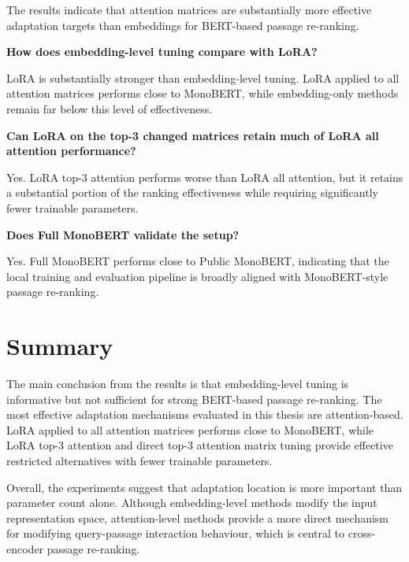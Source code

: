 \begin{description}
The results indicate that attention matrices are substantially more effective adaptation targets than embeddings for BERT-based passage re-ranking.

\vspace{0.6\baselineskip}

\item[\textbf{RQ4}] \textbf{How does embedding-level tuning compare with LoRA?}

\vspace{-0.4\baselineskip}

LoRA is substantially stronger than embedding-level tuning. LoRA applied to all attention matrices performs close to MonoBERT, while embedding-only methods remain far below this level of effectiveness.

\vspace{0.6\baselineskip}

\item[\textbf{RQ5}] \textbf{Can LoRA on the top-3 changed matrices retain much of LoRA all attention performance?}

\vspace{-0.4\baselineskip}

Yes. LoRA top-3 attention performs worse than LoRA all attention, but it retains a substantial portion of the ranking effectiveness while requiring significantly fewer trainable parameters.

\vspace{0.6\baselineskip}

\item[\textbf{RQ6}] \textbf{Does Full MonoBERT validate the setup?}

\vspace{-0.4\baselineskip}

Yes. Full MonoBERT performs close to Public MonoBERT, indicating that the local training and evaluation pipeline is broadly aligned with MonoBERT-style passage re-ranking.

\end{description}


\section{Summary}
\label{sec:results_summary}

The main conclusion from the results is that embedding-level tuning is informative but not sufficient for strong BERT-based passage re-ranking. The most effective adaptation mechanisms evaluated in this thesis are attention-based. LoRA applied to all attention matrices performs close to MonoBERT, while LoRA top-3 attention and direct top-3 attention matrix tuning provide effective restricted alternatives with fewer trainable parameters.

Overall, the experiments suggest that adaptation location is more important than parameter count alone. Although embedding-level methods modify the input representation space, attention-level methods provide a more direct mechanism for modifying query-passage interaction behaviour, which is central to cross-encoder passage re-ranking.